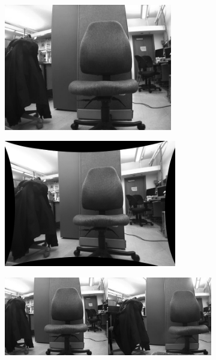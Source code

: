 \begin{figure}
\centering
\begin{subfigure}{0.49\textwidth}
\includegraphics[width=\linewidth, height=5.5cm]{pictures/mono-distorted}
\end{subfigure}
\begin{subfigure}{0.49\textwidth}
\includegraphics[width=\linewidth, height=5.5cm]{pictures/mono-undistorted}
\end{subfigure}
\caption{Image undistortion on a mono calibrated camera image. The pincushion will be centered in the real main focal point.  (source: \href{http://paulbourke.net/stereographics/stereorender/}{paulbourke.net})}
\label{fig:mono_undistort}
\vspace*{0.4cm}
\begin{subfigure}{0.99\linewidth}
\includegraphics[width=\linewidth]{pictures/stereo-distorted}

\end{subfigure}
\end{figure}

